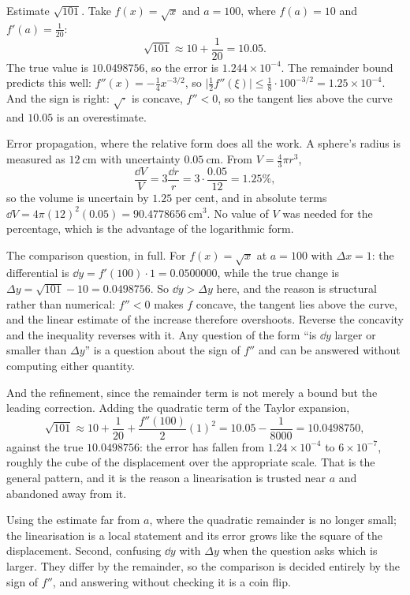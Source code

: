 \begin{worked}
Estimate $\sqrt{101}$. Take $f(x)=\sqrt x$ and $a=100$, where $f(a)=10$ and $f'(a)=\tfrac{1}{20}$:
\[
\sqrt{101}\approx10+\frac{1}{20}=10.05 .
\]
The true value is $10.0498756$, so the error is $1.244\times10^{-4}$. The remainder bound predicts this well: $f''(x)=-\tfrac14x^{-3/2}$, so $\bigl|\tfrac12f''(\xi)\bigr|\leq\tfrac18\cdot100^{-3/2}=1.25\times10^{-4}$. And the sign is right: $\sqrt{\cdot}$ is concave, $f''<0$, so the tangent lies above the curve and $10.05$ is an overestimate.

Error propagation, where the relative form does all the work. A sphere's radius is measured as $12\ \mathrm{cm}$ with uncertainty $0.05\ \mathrm{cm}$. From $V=\tfrac43\pi r^{3}$,
\[
\frac{\dd V}{V}=3\frac{\dd r}{r}=3\cdot\frac{0.05}{12}=1.25\% ,
\]
so the volume is uncertain by $1.25$ per cent, and in absolute terms $\dd V=4\pi(12)^{2}(0.05)=90.4778656\ \mathrm{cm^{3}}$. No value of $V$ was needed for the percentage, which is the advantage of the logarithmic form.

The comparison question, in full. For $f(x)=\sqrt x$ at $a=100$ with $\Delta x=1$: the differential is $\dd y=f'(100)\cdot1=0.0500000$, while the true change is $\Delta y=\sqrt{101}-10=0.0498756$. So $\dd y>\Delta y$ here, and the reason is structural rather than numerical: $f''<0$ makes $f$ concave, the tangent lies above the curve, and the linear estimate of the increase therefore overshoots. Reverse the concavity and the inequality reverses with it. Any question of the form ``is $\dd y$ larger or smaller than $\Delta y$'' is a question about the sign of $f''$ and can be answered without computing either quantity.

And the refinement, since the remainder term is not merely a bound but the leading correction. Adding the quadratic term of the Taylor expansion,
\[
\sqrt{101}\approx10+\frac{1}{20}+\frac{f''(100)}{2}(1)^{2}=10.05-\frac{1}{8000}=10.0498750 ,
\]
against the true $10.0498756$: the error has fallen from $1.24\times10^{-4}$ to $6\times10^{-7}$, roughly the cube of the displacement over the appropriate scale. That is the general pattern, and it is the reason a linearisation is trusted near $a$ and abandoned away from it.
\end{worked}

\begin{trap}
Using the estimate far from $a$, where the quadratic remainder is no longer small; the linearisation is a local statement and its error grows like the square of the displacement. Second, confusing $\dd y$ with $\Delta y$ when the question asks which is larger. They differ by the remainder, so the comparison is decided entirely by the sign of $f''$, and answering without checking it is a coin flip.
\end{trap}

